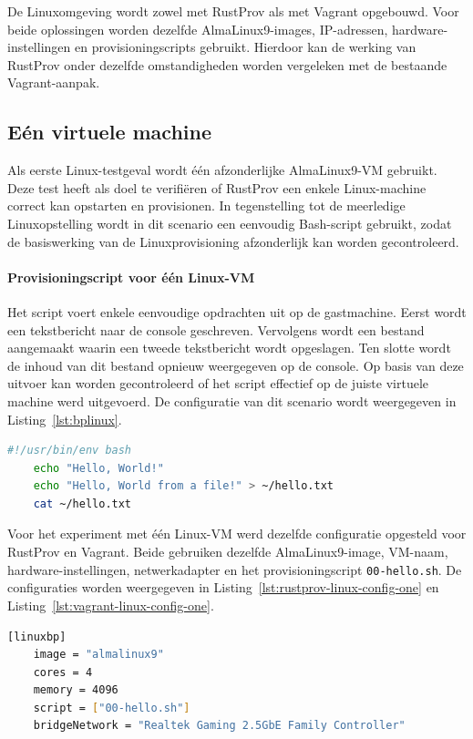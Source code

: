De Linuxomgeving wordt zowel met RustProv als met Vagrant opgebouwd. Voor beide oplossingen worden dezelfde AlmaLinux9-images, IP-adressen, hardware-instellingen en provisioningscripts gebruikt. Hierdoor kan de werking van RustProv onder dezelfde omstandigheden worden vergeleken met de bestaande Vagrant-aanpak.

\subsection{Eén virtuele machine}

Als eerste Linux-testgeval wordt één afzonderlijke AlmaLinux9-VM gebruikt. Deze test heeft als doel te verifiëren of RustProv een enkele Linux-machine correct kan opstarten en provisionen. In tegenstelling tot de meerledige Linuxopstelling wordt in dit scenario een eenvoudig Bash-script gebruikt, zodat de basiswerking van de Linuxprovisioning afzonderlijk kan worden gecontroleerd.

\paragraph{Provisioningscript voor één Linux-VM}

Het script voert enkele eenvoudige opdrachten uit op de gastmachine. Eerst wordt een tekstbericht naar de console geschreven. Vervolgens wordt een bestand aangemaakt waarin een tweede tekstbericht wordt opgeslagen. Ten slotte wordt de inhoud van dit bestand opnieuw weergegeven op de console. Op basis van deze uitvoer kan worden gecontroleerd of het script effectief op de juiste virtuele machine werd uitgevoerd. De configuratie van dit scenario wordt weergegeven in Listing~\ref{lst:bplinux}.

\begin{lstlisting}[language=bash,caption={Eenvoudig provisioningscript voor één Linux-VM.},label={lst:bplinux}]
    #!/usr/bin/env bash
    echo "Hello, World!"
    echo "Hello, World from a file!" > ~/hello.txt
    cat ~/hello.txt
\end{lstlisting}

Voor het experiment met één Linux-VM werd dezelfde configuratie opgesteld voor RustProv en Vagrant. Beide gebruiken dezelfde AlmaLinux9-image, VM-naam, hardware-instellingen, netwerkadapter en het provisioningscript \texttt{00-hello.sh}. De configuraties worden weergegeven in Listing~\ref{lst:rustprov-linux-config-one} en Listing~\ref{lst:vagrant-linux-config-one}.

\begin{lstlisting}[language=bash,caption={RustProv-configuratie voor één Linux-VM.},label={lst:rustprov-linux-config-one}]
    [linuxbp]
    image = "almalinux9"
    cores = 4
    memory = 4096
    script = ["00-hello.sh"]
    bridgeNetwork = "Realtek Gaming 2.5GbE Family Controller"
\end{lstlisting}



